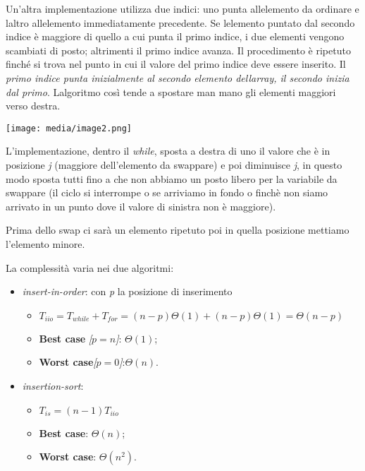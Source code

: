 Un'altra implementazione utilizza due indici: uno punta
all\textquotesingle elemento da ordinare e l\textquotesingle altro
all\textquotesingle elemento immediatamente precedente. Se
l\textquotesingle elemento puntato dal secondo indice è maggiore di
quello a cui punta il primo indice, i due elementi vengono scambiati di
posto; altrimenti il primo indice avanza. Il procedimento è ripetuto
finché si trova nel punto in cui il valore del primo indice deve essere
inserito. Il \emph{primo indice punta inizialmente al secondo}
\emph{elemento dell\textquotesingle array, il secondo inizia dal primo}.
L\textquotesingle algoritmo così tende a spostare man mano gli elementi
maggiori verso destra.

\texttt{[image: media/image2.png]}

L'implementazione, dentro il \emph{while}, sposta a destra di uno il
valore che è in posizione \emph{j} (maggiore dell'elemento da swappare)
e poi diminuisce \emph{j}, in questo modo sposta tutti fino a che non
abbiamo un posto libero per la variabile da swappare (il ciclo si
interrompe o se arriviamo in fondo o finchè non siamo arrivato in un
punto dove il valore di sinistra non è maggiore).

Prima dello swap ci sarà un elemento ripetuto poi in quella posizione
mettiamo l'elemento minore.

La complessità varia nei due algoritmi:

\begin{itemize}
\item
  \emph{insert-in-order}: con \emph{p} la posizione di inserimento

  \begin{itemize}
  \item
    \(T_{iio} = T_{while} + T_{for} = (n - p)\Theta(1) + (n - p)\Theta(1) = \Theta(n - p)\)
  \item
    \textbf{Best case} \emph{{[}}\(p = n\)\emph{{]}}: \(\Theta(1)\);
  \item
    \textbf{Worst case}\emph{{[}}\(p = 0\)\emph{{]}}:\(\Theta(n)\).
  \end{itemize}
\item
  \emph{insertion-sort}:

  \begin{itemize}
  \item
    \(T_{is} = (n - 1)T_{iio}\)
  \item
    \textbf{Best case}: \(\Theta(n)\);
  \item
    \textbf{Worst case}: \(\Theta(n^{2})\).
  \end{itemize}
\end{itemize}

